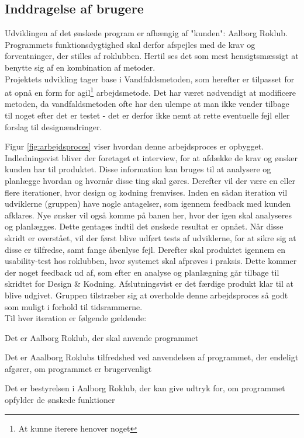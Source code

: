 \subsection{Inddragelse af brugere}
\label{sec:metode_samarbejde}
Udviklingen af det ønskede program er afhængig af "kunden"\mbox{}: Aalborg Roklub. Programmets funktionsdygtighed skal derfor afspejles med de krav og forventninger, der stilles af roklubben. Hertil ses det som mest hensigtsmæssigt at benytte sig af en kombination af metoder.\\

Projektets udvikling tager base i Vandfaldsmetoden, som herefter er tilpasset for at opnå en form for agil\footnote{At kunne iterere henover noget} arbejdsmetode. Det har været nødvendigt at modificere metoden, da vandfaldsmetoden ofte har den ulempe at man ikke vender tilbage til noget efter det er testet - det er derfor ikke nemt at rette eventuelle fejl eller forslag til designændringer. \cite{Vandfaldsmetoden}


Figur \ref{fig:arbejdsproces} viser hvordan denne arbejdsproces er opbygget. Indledningsvist bliver der foretaget et interview, for at afdække de krav og ønsker kunden har til produktet. Disse information kan bruges til at analysere og planlægge hvordan og hvornår disse ting skal gøres. Derefter vil der være en eller flere iterationer, hvor design og kodning fremvises. Inden en sådan iteration vil udviklerne (gruppen) have nogle antagelser, som igennem feedback med kunden afklares. Nye ønsker vil også komme på banen her, hvor der igen skal analyseres og planlægges. Dette gentages indtil det ønskede resultat er opnået. Når disse skridt er overstået, vil der først blive udført tests af udviklerne, for at sikre sig at disse er tilfredse, samt fange åbenlyse fejl. Derefter skal produktet igennem en usability-test hos roklubben, hvor systemet skal afprøves i praksis. Dette kommer der noget feedback ud af, som efter en analyse og planlægning går tilbage til skridtet for Design \& Kodning. Afslutningsvist er det færdige produkt klar til at blive udgivet. Gruppen tilstræber sig at overholde denne arbejdsproces så godt som muligt i forhold til tidsrammerne. \\

Til hver iteration er følgende gældende:
\begin{itemize_small}
    \item Det er Aalborg Roklub, der skal anvende programmet
    \item Det er Aaalborg Roklubs tilfredshed ved anvendelsen af programmet, der                endeligt afgører, om programmet er brugervenligt
    \item Det er bestyrelsen i Aalborg Roklub, der kan give udtryk for, om programmet           opfylder de ønskede funktioner
\end{itemize_small}

